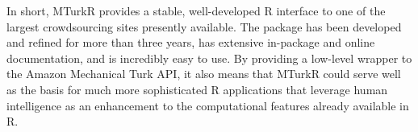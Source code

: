 In short, MTurkR provides a stable, well-developed R interface to one of the largest crowdsourcing sites presently available. The package has been developed and refined for more than three years, has extensive in-package and online documentation, and is incredibly easy to use. By providing a low-level wrapper to the Amazon Mechanical Turk API, it also means that MTurkR could serve well as the basis for much more sophisticated R applications that leverage human intelligence as an enhancement to the computational features already available in R.



\address{Thomas J. Leeper\\
Department of Government\\
London School of Economics and Political Science\\
London, United Kingdom}\\
